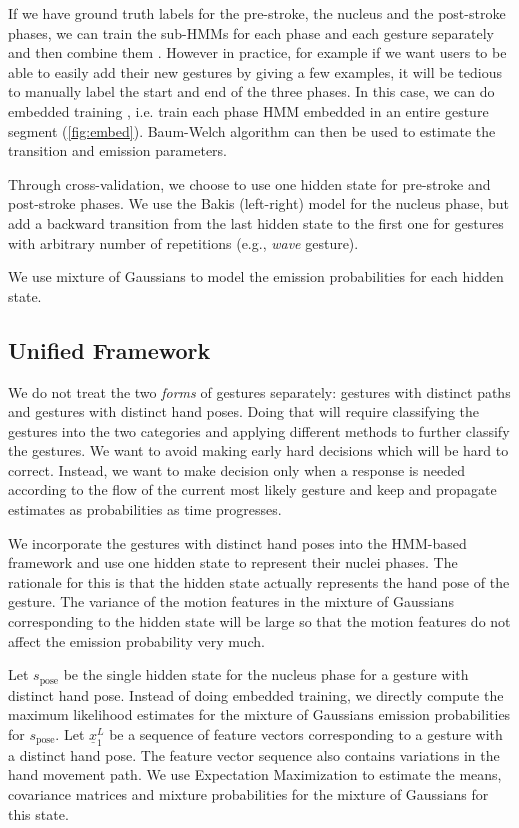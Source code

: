\documentclass[conference]{IEEEtran}
\begin{document}
If we have ground truth labels for the pre-stroke, the nucleus and the
post-stroke phases, we can train the sub-HMMs for each phase and each gesture
separately and then combine them \cite{yin13}. However in practice, for example
if we want users to be able to easily add their new gestures by giving a few
examples, it will be tedious to manually label the start and end of the
three phases. In this case, we can do embedded training \cite{young1994}, i.e.
train each phase HMM embedded in an entire gesture segment (\ref{fig:embed}).
Baum-Welch algorithm can then be used to estimate the transition and emission
parameters.

Through cross-validation, we choose to use one hidden state for pre-stroke and
post-stroke phases. We use the Bakis (left-right) model \cite{Bauer00} for the
nucleus phase, but add a backward transition from the last hidden state to the first
one for gestures with arbitrary number of repetitions (e.g., \textit{wave}
gesture).

We use mixture of Gaussians to model the emission probabilities for each hidden
state. 

\subsection{Unified Framework}
We do not treat the two \textit{forms} of gestures separately: gestures with
distinct paths and gestures with distinct hand poses. Doing that will require
classifying the gestures into the two categories and applying different methods
to further classify the gestures. We want to avoid making early hard decisions
which will be hard to correct. Instead, we want to make decision only when a
response is needed according to the flow of the current most likely gesture and
keep and propagate estimates as probabilities as time progresses.

We incorporate the gestures with distinct hand poses into the HMM-based
framework and use one hidden state to represent their nuclei phases. The
rationale for this is that the hidden state actually represents the hand pose of
the gesture. The variance of the motion features in the mixture of Gaussians
corresponding to the hidden state will be large so that the motion features do
not affect the emission probability very much.

Let $s_{\text{pose}}$ be the single hidden state for the nucleus phase for a
gesture with distinct hand pose. Instead of doing embedded training, we directly
compute the maximum likelihood estimates for the mixture of Gaussians emission
probabilities for $s_{\text{pose}}$. Let $\underline{x}_1^L$ be a sequence of
feature vectors corresponding to a gesture with a distinct hand pose. The
feature vector sequence also contains variations in the hand movement path. We
use Expectation Maximization to estimate the means, covariance matrices and
mixture probabilities for the mixture of Gaussians for this state.
\end{document}
